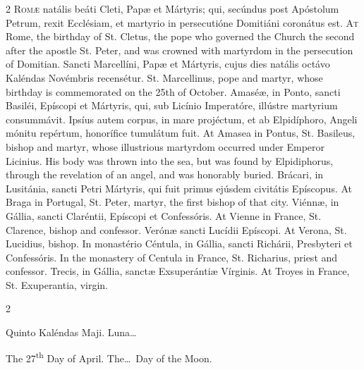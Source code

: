 \begin{paracol}{2}
\lettrine[lines=2]{R}{omæ} natális beáti 
 Cleti, Papæ et Mártyris; qui, secúndus post Apóstolum Petrum, rexit 
 Ecclésiam, et martyrio in persecutióne Domitiáni coronátus est.
\switchcolumn
{}
\lettrine[lines=2]{A}{t} Rome, the birthday of St. 
 Cletus, the pope who governed the Church the second after the apostle St. 
 Peter, and was crowned with martyrdom in the persecution of Domitian.
\switchcolumn*
{}
Sancti Marcellíni, 
 Papæ et Mártyris, cujus dies natális octávo Kaléndas Novémbris recensétur.
\switchcolumn
{}
St. Marcellinus, pope and martyr, 
 whose birthday is commemorated on the 25th of October.
\switchcolumn*
{}
Amaséæ, in Ponto, 
 sancti Basiléi, Epíscopi et Mártyris, qui, sub Licínio Imperatóre, illústre 
 martyrium consummávit. Ipsíus autem corpus, in mare projéctum, et ab 
 Elpidíphoro, Angeli mónitu repértum, honorífice tumulátum fuit.
\switchcolumn
{}
At Amasea in Pontus, St. Basileus, 
 bishop and martyr, whose illustrious martyrdom occurred under Emperor 
 Licinius. His body was thrown into the sea, but was found by 
 Elpidiphorus, through the revelation of an angel, and was honorably buried.
\switchcolumn*
{}
Brácari, in Lusitánia, 
 sancti Petri Mártyris, qui fuit primus ejúsdem civitátis Epíscopus.
\switchcolumn
{}
At Braga in Portugal, St. Peter, 
 martyr, the first bishop of that city.
\switchcolumn*
{}
Viénnæ, in Gállia, 
 sancti Claréntii, Epíscopi et Confessóris.
\switchcolumn
{}
At Vienne in France, St. Clarence, 
 bishop and confessor.
\switchcolumn*
{}
Verónæ sancti Lucídii 
 Epíscopi.
\switchcolumn
{}
At Verona, St. Lucidius, bishop.
\switchcolumn*
{}
In monastério Céntula, 
 in Gállia, sancti Richárii, Presbyteri et Confessóris.
\switchcolumn
{}
In the monastery of Centula in 
 France, St. Richarius, priest and confessor.
\switchcolumn*
{}
Trecis, in Gállia, 
 sanctæ Exsuperántiæ Vírginis.
\switchcolumn
{}
At Troyes in France, St. 
 Exuperantia, virgin.
\switchcolumn*
{}
\end{paracol}


\begin{paracol}{2}
\begin{center}{\color{gregoriocolor} Quinto Kaléndas Maji. 
 Luna\dots\ }\end{center}
\switchcolumn
{}
\begin{center}{\color{gregoriocolor} The 
 27\textsuperscript{th} Day of April. The\dots\ Day of the Moon.}\end{center}
\end{paracol}

